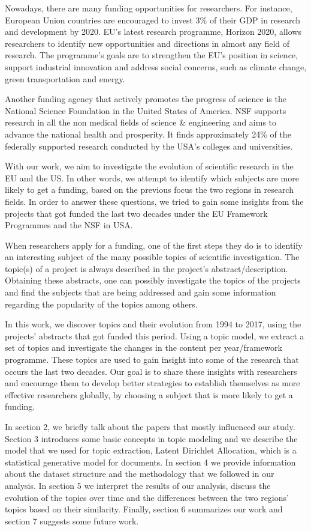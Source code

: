 \documentclass[12pt]{report}
\begin{document}
Nowadays, there are many funding opportunities for researchers. For instance,
European Union countries are encouraged to invest 3\% of their GDP in research
and development by 2020. EU's latest research programme, Horizon 2020, allows
researchers to identify new opportunities and directions in almost any field of
research. The programme's goals are to strengthen the EU's position in science,
support industrial innovation and address social concerns, such as climate
change, green transportation and energy.

Another funding agency that actively promotes the progress of science is the
National Science Foundation in the United States of America. NSF supports
research in all the non medical fields of science \& engineering and aims to
advance the national health and prosperity. It finds approximately 24\% of the
federally supported research conducted by the USA's colleges and universities.

With our work, we aim to investigate the evolution of scientific research in the
EU and the US. In other words, we attempt to identify which subjects are more
likely to get a funding, based on the previous focus the two regions in research
fields. In order to answer these questions, we tried to gain some insights from
the projects that got funded the last two decades under the EU Framework
Programmes and the NSF in USA.

When researchers apply for a funding, one of the first steps they do is to
identify an interesting subject of the many possible topics of scientific
investigation. The topic(s) of a project is always described in the project's
abstract/description. Obtaining these abstracts, one can possibly investigate
the topics of the projects and find the subjects that are being addressed and
gain some information regarding the popularity of the topics among others.

In this work, we discover topics and their evolution from 1994 to 2017, using
the projects' abstracts that got funded this period. Using a topic model, we
extract a set of topics and investigate the changes in the content per
year/framework programme. These topics are used to gain insight into some of the
research that occurs the last two decades. Our goal is to share these insights
with researchers and encourage them to develop better strategies to establish
themselves as more effective researchers globally, by choosing a subject that is
more likely to get a funding.

In section 2, we briefly talk about the papers that mostly influenced our study.
Section 3 introduces some basic concepts in topic modeling and we describe the
model that we used for topic extraction, Latent Dirichlet Allocation, which is a
statistical generative model for documents. In section 4 we provide information
about the dataset structure and the methodology that we followed in our
analysis. In section 5 we interpret the results of our analysis, discuss the
evolution of the topics over time and the differences between the two regions'
topics based on their similarity. Finally, section 6 summarizes our work and
section 7 suggests some future work.
\end{document}
